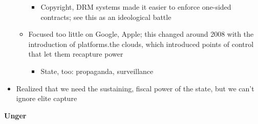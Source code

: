 \begin{itemize}
\begin{itemize}
    \begin{itemize}
    \tightlist
    \item
      Copyright, DRM systems made it easier to enforce one-sided
      contracts; see this as an ideological battle
    \end{itemize}
  \item
    Focused too little on Google, Apple; this changed around 2008 with
    the introduction of platforms.the clouds, which introduced points of
    control that let them recapture power

    \begin{itemize}
    \tightlist
    \item
      State, too: propaganda, surveillance
    \end{itemize}
  \end{itemize}
\item
  Realized that we need the sustaining, fiscal power of the state, but
  we can't ignore elite capture
\end{itemize}

\textbf{Unger}

